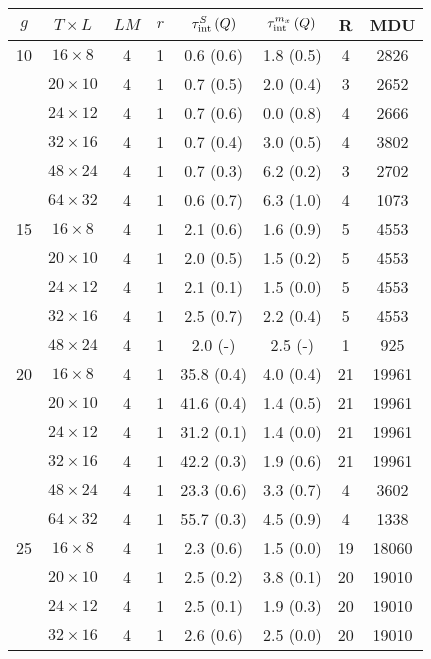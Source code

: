 \begin{longtable}{cccccccc}
\toprule
$g$ & $T\times L$ & $LM$ & $r$ & $\tau_{\rm int}^{S}\,(Q)$ & $\tau_{\rm int}^{m_x}\,(Q)$ & R & MDU \\
\midrule
 10 & $16 \times   8$ &  4 & 1 & 0.6 \; (0.6) & 1.8 \; (0.5) & 4 & 2826 \\
    & $20 \times  10$ &  4 & 1 & 0.7 \; (0.5) & 2.0 \; (0.4) & 3 & 2652 \\
    & $24 \times  12$ &  4 & 1 & 0.7 \; (0.6) & 0.0 \; (0.8) & 4 & 2666 \\
    & $32 \times  16$ &  4 & 1 & 0.7 \; (0.4) & 3.0 \; (0.5) & 4 & 3802 \\
    & $48 \times  24$ &  4 & 1 & 0.7 \; (0.3) & 6.2 \; (0.2) & 3 & 2702 \\
    & $64 \times  32$ &  4 & 1 & 0.6 \; (0.7) & 6.3 \; (1.0) & 4 & 1073 \\
\midrule
 15 & $16 \times   8$ &  4 & 1 & 2.1 \; (0.6) & 1.6 \; (0.9) & 5 & 4553 \\
    & $20 \times  10$ &  4 & 1 & 2.0 \; (0.5) & 1.5 \; (0.2) & 5 & 4553 \\
    & $24 \times  12$ &  4 & 1 & 2.1 \; (0.1) & 1.5 \; (0.0) & 5 & 4553 \\
    & $32 \times  16$ &  4 & 1 & 2.5 \; (0.7) & 2.2 \; (0.4) & 5 & 4553 \\
    & $48 \times  24$ &  4 & 1 & 2.0 \; (-) & 2.5 \; (-) & 1 & 925 \\
\midrule
 20 & $16 \times   8$ &  4 & 1 & 35.8 \; (0.4) & 4.0 \; (0.4) & 21 & 19961 \\
    & $20 \times  10$ &  4 & 1 & 41.6 \; (0.4) & 1.4 \; (0.5) & 21 & 19961 \\
    & $24 \times  12$ &  4 & 1 & 31.2 \; (0.1) & 1.4 \; (0.0) & 21 & 19961 \\
    & $32 \times  16$ &  4 & 1 & 42.2 \; (0.3) & 1.9 \; (0.6) & 21 & 19961 \\
    & $48 \times  24$ &  4 & 1 & 23.3 \; (0.6) & 3.3 \; (0.7) & 4 & 3602 \\
    & $64 \times  32$ &  4 & 1 & 55.7 \; (0.3) & 4.5 \; (0.9) & 4 & 1338 \\
\midrule
 25 & $16 \times   8$ &  4 & 1 & 2.3 \; (0.6) & 1.5 \; (0.0) & 19 & 18060 \\
    & $20 \times  10$ &  4 & 1 & 2.5 \; (0.2) & 3.8 \; (0.1) & 20 & 19010 \\
    & $24 \times  12$ &  4 & 1 & 2.5 \; (0.1) & 1.9 \; (0.3) & 20 & 19010 \\
    & $32 \times  16$ &  4 & 1 & 2.6 \; (0.6) & 2.5 \; (0.0) & 20 & 19010 \\

\end{longtable}
